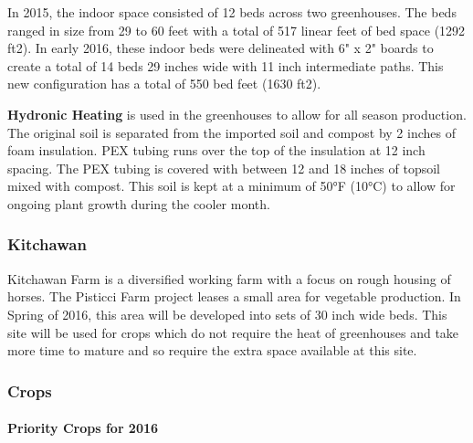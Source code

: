 In 2015, the indoor space consisted of 12 beds across two greenhouses.
The beds ranged in size from 29 to 60 feet with a total of 517 linear
feet of bed space (1292 ft2). In early 2016, these indoor beds were
delineated with 6" x 2" boards to create a total of 14 beds 29 inches
wide with 11 inch intermediate paths. This new configuration has a total
of 550 bed feet (1630 ft2).

\textbf{Hydronic Heating} is used in the greenhouses to allow for all
season production. The original soil is separated from the imported soil
and compost by 2 inches of foam insulation. PEX tubing runs over the top
of the insulation at 12 inch spacing. The PEX tubing is covered with
between 12 and 18 inches of topsoil mixed with compost. This soil is
kept at a minimum of 50°F (10°C) to allow for ongoing plant growth
during the cooler month.

\subsubsection{Kitchawan}\label{kitchawan}

Kitchawan Farm is a diversified working farm with a focus on rough
housing of horses. The Pisticci Farm project leases a small area for
vegetable production. In Spring of 2016, this area will be developed
into sets of 30 inch wide beds. This site will be used for crops which
do not require the heat of greenhouses and take more time to mature and
so require the extra space available at this site.

\subsubsection{Crops}\label{crops}

\paragraph{Priority Crops for 2016}\label{priority-crops-for-2016}

